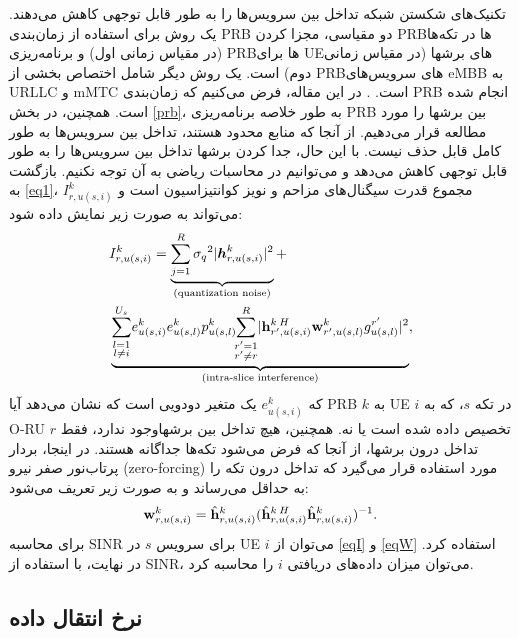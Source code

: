    تکنیک‌های شکستن شبکه
   تداخل بین سرویس‌ها را به طور قابل توجهی کاهش می‌دهند. یک روش برای استفاده از زمان‌بندی PRB دو مقیاسی، مجزا کردن PRBها در تکه‌ها (در مقیاس زمانی اول) و برنامه‌ریزی PRBها برای UEهای برشها (در مقیاس زمانی دوم) است. یک روش دیگر شامل اختصاص بخشی از PRBهای سرویس‌های eMBB به URLLC و mMTC است.
  \cite{alsenwi2021intelligent, setayesh2020joint, mei2021intelligent}. در این مقاله، فرض می‌کنیم که زمان‌بندی PRB انجام شده است. همچنین، در بخش \ref{prb}، به طور خلاصه برنامه‌ریزی PRB بین برشها را مورد مطالعه قرار می‌دهیم.
  از آنجا که منابع محدود هستند، تداخل بین سرویس‌ها به طور کامل قابل حذف نیست. با این حال، جدا کردن برشها تداخل بین سرویس‌ها را به طور قابل توجهی کاهش می‌دهد و می‌توانیم در محاسبات ریاضی به آن توجه نکنیم.
  بازگشت به \eqref{eq1}، $I_{r,u(s,i)}^{k}$ مجموع قدرت سیگنال‌های مزاحم و نویز کوانتیزاسیون است و می‌تواند به صورت زیر نمایش داده شود:
\begin{align}\label{eqI}
	&I_{r,u(s,i)}^{k} =\underbrace{  \sum_{j=1}^{{R}} {\sigma_q}^2 |\boldsymbol{h}_{r,{u(s,i)}}^k|^2 }_{\text{(quantization noise)}} + \nonumber\\
	&\underbrace{\sum_{\substack{l=1 \\ l\neq i}}^{{U}_{s}}\! e^{k}_{u(s,i)}e^{k}_{u(s,l)}  p_{u(s,l)}^{k}\!\!\sum_{\substack{r'=1 \\ r'\neq r}}^{R}\!|{\bold{h}_{r',u(s,i)}^{k \: H}} \bold{w}_{r',u(s,l)}^{k} g_{u(s,l)}^{r'}|^2}_{\text{(intra-slice interference)}},
\end{align}
  که $e^{k}_{u(s,i)}$ یک متغیر دودویی است که نشان می‌دهد آیا PRB $k$ به UE $i$ در تکه $s$، که به O-RU $r$ تخصیص داده شده است یا نه. همچنین، هیچ تداخل بین برشهاوجود ندارد، فقط تداخل درون برشها، از آنجا که فرض می‌شود تکه‌ها جداگانه هستند.
  در اینجا، بردار پرتاب‌نور صفر نیرو (zero-forcing) مورد استفاده قرار می‌گیرد که تداخل درون تکه را به حداقل می‌رساند و به صورت زیر تعریف می‌شود:
\begin{equation}
	\bold{w}_{r,u(s,i)}^{k} = \hat{\bold{h}}_{r,u(s,i)}^{k}(\hat{\bold{h}}_{r,u(s,i)}^{k \: H} \hat{\bold{h}}_{r,u(s,i)}^{k})^{-1}.
\end{equation}
  برای محاسبه SINR برای سرویس $s$ در UE $i$ می‌توان از \eqref{eqI} و \eqref{eqW} استفاده کرد. در نهایت، با استفاده از SINR، می‌توان میزان داده‌های دریافتی $i$ را محاسبه کرد. 
   
   \subsection{نرخ انتقال داده}

